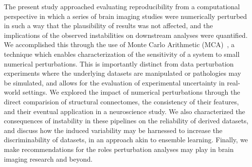 \documentclass[fleqn,10pt]{SelfArx} %
\newcommand{\new}[1]{{\color{blue} #1}}
\begin{document}
The present study approached evaluating reproducibility from a computational perspective in which a series of brain
imaging studies were numerically perturbed \new{in} such \new{a way} that the plausibility of results was not affected, and the
implications of the observed instabilities \new{on downstream analyses} were quantified. We accomplished this through the use of Monte Carlo
Arithmetic (MCA)~\cite{Parker1997-qq}, a technique which enables characterization of the sensitivity of a system to
small \new{numerical} perturbations. \new{This is importantly distinct from data perturbation experiments where the underlying
datasets are manipulated or pathologies may be simulated, and allows for the evaluation of experimental uncertainty in real-world
settings.} We explored the impact of \new{numerical} perturbations through the direct comparision of structural connectomes,
the consistency of their features, and their eventual application in a neuroscience study. \new{We also characterized the}
consequences \new{of instability in these pipelines on the reliability of derived datasets,} and \new{discuss how the induced
variability may be harnessed to increase the discriminability of datasets, in an approach akin to ensemble learning}.
\new{Finally, we} make recommendations for the roles \new{perturbation} analyses may play in brain imaging research \new{and beyond}.

\end{document}
